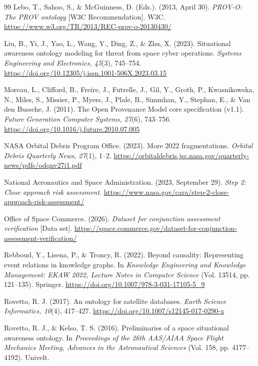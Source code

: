 \documentclass[Royal,sageh,times]{sagej}
\begin{document}
\begin{thebibliography}{99}
Lebo, T., Sahoo, S., \& McGuinness, D. (Eds.). (2013, April 30). \textit{PROV-O: The PROV ontology} [W3C Recommendation]. W3C. \url{https://www.w3.org/TR/2013/REC-prov-o-20130430/}

Liu, B., Yi, J., Yao, L., Wang, Y., Ding, Z., \& Zhu, X. (2023). Situational awareness ontology modeling for threat from space cyber operations. \textit{Systems Engineering and Electronics, 45}(3), 745--754. \url{https://doi.org/10.12305/j.issn.1001-506X.2023.03.15}

Moreau, L., Clifford, B., Freire, J., Futrelle, J., Gil, Y., Groth, P., Kwasnikowska, N., Miles, S., Missier, P., Myers, J., Plale, B., Simmhan, Y., Stephan, E., \& Van den Bussche, J. (2011). The Open Provenance Model core specification (v1.1). \textit{Future Generation Computer Systems, 27}(6), 743--756. \url{https://doi.org/10.1016/j.future.2010.07.005}

NASA Orbital Debris Program Office. (2023). More 2022 fragmentations. \textit{Orbital Debris Quarterly News, 27}(1), 1--2. \url{https://orbitaldebris.jsc.nasa.gov/quarterly-news/pdfs/odqnv27i1.pdf}

National Aeronautics and Space Administration. (2023, September 29). \textit{Step 2: Close approach risk assessment}. \url{https://www.nasa.gov/cara/step-2-close-approach-risk-assessment/}

Office of Space Commerce. (2026). \textit{Dataset for conjunction assessment verification} [Data set]. \url{https://space.commerce.gov/dataset-for-conjunction-assessment-verification/}

Rebboud, Y., Lisena, P., \& Troncy, R. (2022). Beyond causality: Representing event relations in knowledge graphs. In \textit{Knowledge Engineering and Knowledge Management: EKAW 2022, Lecture Notes in Computer Science} (Vol. 13514, pp. 121--135). Springer. \url{https://doi.org/10.1007/978-3-031-17105-5_9}

Rovetto, R. J. (2017). An ontology for satellite databases. \textit{Earth Science Informatics, 10}(4), 417--427. \url{https://doi.org/10.1007/s12145-017-0290-x}

Rovetto, R. J., \& Kelso, T. S. (2016). Preliminaries of a space situational awareness ontology. In \textit{Proceedings of the 26th AAS/AIAA Space Flight Mechanics Meeting, Advances in the Astronautical Sciences} (Vol. 158, pp. 4177--4192). Univelt.


\end{thebibliography}
\end{document}
